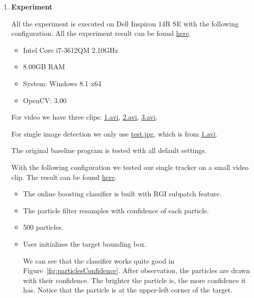 \documentclass[a4paper]{article}
\begin{document}
\begin{enumerate}
\item \textbf{Experiment}

All the experiment is executed on Dell Inspiron 14R SE with the following configuration.
All the experiment result can be found \href{https://zerowong.github.io/PedestrainCounting/results/}{here}.

\begin{itemize}

\item Intel Core i7-3612QM 2.10GHz
\item 8.00GB RAM
\item System: Windows 8.1 x64
\item OpenCV: 3.00

\end{itemize}

For video we have three clips: \href{https://zerowong.github.io/PedestrainCounting/results/test/1.avi}{1.avi}, \href{https://zerowong.github.io/PedestrainCounting/results/test/2.avi}{2.avi}, \href{https://zerowong.github.io/PedestrainCounting/results/test/3.avi}{3.avi}.

For single image detection we only use \href{https://zerowong.github.io/PedestrainCounting/results/test/test.jpg}{test.jpg}, which is from \href{https://zerowong.github.io/PedestrainCounting/results/test/1.avi}{1.avi}.

The original baseline program is tested with all default settings.

With the following configuration we tested our single tracker on a small video clip. The result can be found \href{https://zerowong.github.io/PedestrainCounting/results/singleTrackerTestGray01.avi}{here}.

\begin{itemize}

\item The online boosting classifier is built with RGI subpatch feature.
\item The particle filter resamples with confidence of each particle.
\item 500 particles.
\item User initializes the target bounding box.

We can see that the classifier works quite good in Figure~\ref{fig:particlesConfidence}. After observation, the particles are drawn with their confidence. The brighter the particle is, the more confidence it has. Notice that the particle is at the upper-left corner of the target.


\end{itemize}
\end{enumerate}
\end{document}
